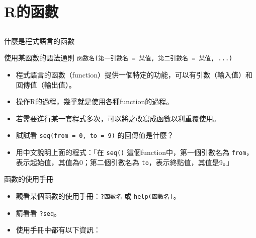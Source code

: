 \documentclass[12pt, aspectratio=43]{beamer}
\begin{document}

\section{R的函數}\subsection{}

\begin{frame}[fragile]{什麼是程式語言的函數}

\begin{block}{使用某函數的語法通則}
\verb+函數名(第一引數名 = 某值, 第二引數名 = 某值, ...)+ 
\end{block}

\begin{itemize}
\item 程式語言的函數（function）提供一個特定的功能，可以有引數（輸入值）和回傳值（輸出值）。
\item 操作R的過程，幾乎就是使用各種function的過程。
\item 若需要進行某一套程式多次，可以將之改寫成函數以利重覆使用。
\item 試試看 \verb+seq(from = 0, to = 9)+ 的回傳值是什麼？
\item 用中文說明上面的程式：「在 \verb+seq()+ 這個function中，第一個引數名為 \verb+from+，表示起始值，其值為0；第二個引數名為 \verb+to+，表示終點值，其值是9。」
\end{itemize}
\end{frame}



\begin{frame}[fragile]{函數的使用手冊}
\begin{itemize}
\item 觀看某個函數的使用手冊：\verb+?函數名+ 或 \verb+help(函數名)+。
\item 請看看 \verb+?seq+。
\item 使用手冊中都有以下資訊：
\end{itemize}
\end{frame}
\end{document}
